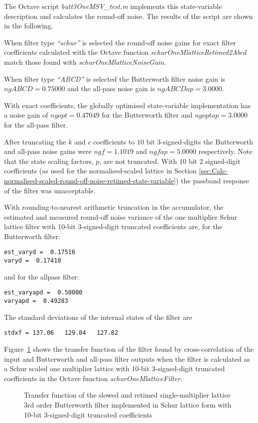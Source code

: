 \documentclass[a4paper,twoside,10pt,english]{report}
\begin{document}
The Octave script \emph{butt3OneMSV\_test.m} implements this state-variable 
description and calculates the round-off noise. The results of the script are 
shown in the following. 

When filter type \emph{``schur''} is selected the round-off noise gains 
for exact filter coefficients calculated with the Octave function
\emph{schurOneMlatticeRetimed2Abcd} match those found with
\emph{schurOneMlatticeNoiseGain}.

When filter type \emph{``ABCD''} is selected the Butterworth filter noise
gain is $ngABCD=0.75000$ and the all-pass noise gain is $ngABCDap=3.0000$.

With exact coefficients, the globally optimised state-variable implementation
has a noise gain of $ngopt=0.47049$ for the Butterworth filter and
$ngoptap=3.0000$ for the all-pass filter.

After truncating the $k$ and $c$ coefficients to $10$ bit 3-signed-digits the
Butterworth and all-pass noise gains were $ngf=1.1019$ and $ngfap=5.0000$
respectively. Note that the state scaling factors, $p$, are not truncated. 
With $10$ bit 2 signed-digit coefficients (as used for the normalised-scaled 
lattice in Section 
\ref{sec:Calc-normalised-scaled-round-off-noise-retimed-state-variable})
the passband response of the filter was unacceptable.

With rounding-to-nearest arithmetic truncation in the accumulator, the 
estimated and measured round-off noise variance of the one multiplier Schur
lattice filter with 10-bit 3-signed-digit truncated coefficients are, for 
the Butterworth filter:
\begin{small}
\begin{verbatim}
est_varyd =  0.17516
varyd =  0.17410
\end{verbatim}
\end{small}
and for the allpass filter:
\begin{small}
\begin{verbatim}
est_varyapd =  0.50000
varyapd =  0.49283
\end{verbatim}
\end{small}
The standard deviations of the internal states of the filter are
\begin{small}
\begin{verbatim}
stdxf = 137.06   129.04   127.82
\end{verbatim}
\end{small}

Figure~\ref{fig:Butt3OneMSV-Resp-Schur-lattice} shows the transfer function of
the filter found by cross-correlation of the input and Butterworth and all-pass
filter outputs when the filter is calculated as a Schur scaled one multiplier
lattice with 10-bit 3-signed-digit truncated coefficients in the Octave 
function \emph{schurOneMlatticeFilter}. 
\begin{figure}[!htbp]
\centering
\scalebox{0.7}{}
\caption{Transfer function of the slowed and retimed single-multiplier lattice 3rd order Butterworth filter implemented in Schur lattice form with 10-bit 3-signed-digit truncated coefficients}
\label{fig:Butt3OneMSV-Resp-Schur-lattice}
\end{figure}
\clearpage
\end{document}
